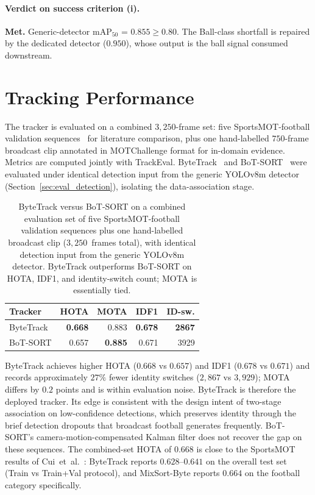 \paragraph{Verdict on success criterion (i).}
\textbf{Met.} Generic-detector \texttt{$\mathrm{mAP}_{50}$} = $0.855 \geq 0.80$.
The Ball-class shortfall is repaired by the dedicated detector
($0.950$), whose output is the ball signal consumed downstream.

\section{Tracking Performance}
\label{sec:eval_tracking}

The tracker is evaluated on a combined $3{,}250$-frame set: five
SportsMOT-football validation sequences~\cite{Cui2023SportsMOT} for
literature comparison, plus one hand-labelled $750$-frame broadcast
clip annotated in MOTChallenge format for in-domain evidence. Metrics
are computed jointly with TrackEval. ByteTrack~\cite{ByteTrack} and
BoT-SORT~\cite{BoTSORT} were evaluated under identical detection input from
the generic YOLOv8m detector (Section~\ref{sec:eval_detection}),
isolating the data-association stage.

\begin{table}[h]
\centering
\small
\begin{tabular}{lrrrr}
\toprule
Tracker & HOTA & MOTA & IDF1 & ID-sw. \\
\midrule
ByteTrack & \textbf{0.668} & 0.883 & \textbf{0.678} & \textbf{2867} \\
BoT-SORT  & 0.657 & \textbf{0.885} & 0.671 & 3929 \\
\bottomrule
\end{tabular}
\caption[Tracker comparison on the combined evaluation
set.]{ByteTrack versus BoT-SORT on a combined evaluation set of
five SportsMOT-football validation sequences plus one
hand-labelled broadcast clip ($3{,}250$~frames total), with
identical detection input from the generic YOLOv8m detector.
ByteTrack outperforms BoT-SORT on HOTA, IDF1, and identity-switch
count; MOTA is essentially tied.}
\label{tab:tracker_comparison}
\end{table}

ByteTrack achieves higher HOTA ($0.668$ vs $0.657$) and IDF1 ($0.678$ vs
$0.671$) and records approximately $27\%$ fewer identity switches
($2{,}867$ vs $3{,}929$); MOTA differs by $0.2$ points and is within
evaluation noise. ByteTrack is therefore the deployed tracker. Its
edge is consistent with the design intent of two-stage association on
low-confidence detections, which preserves identity through the brief
detection dropouts that broadcast football generates frequently.
BoT-SORT's camera-motion-compensated Kalman filter does not recover
the gap on these sequences. The combined-set HOTA of $0.668$ is close
to the SportsMOT results of Cui~et~al.~\cite{Cui2023SportsMOT}:
ByteTrack reports $0.628$--$0.641$ on the overall test set (Train vs
Train+Val protocol), and MixSort-Byte reports $0.664$ on the football
category specifically.


